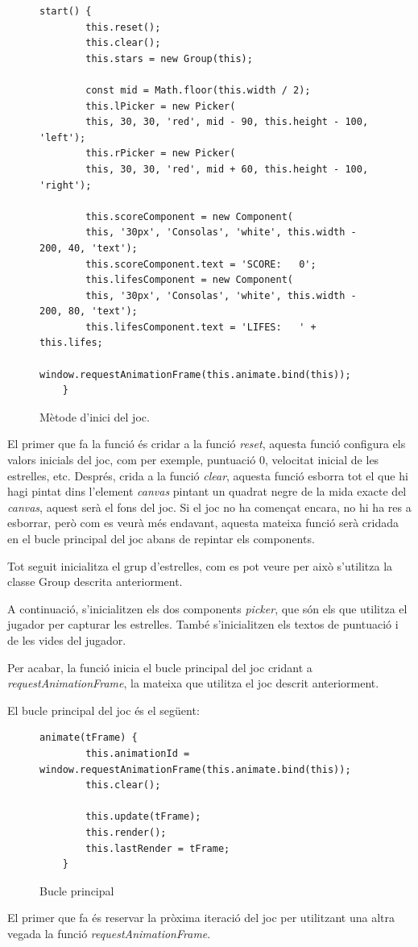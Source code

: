 \documentclass[12pt,a4paper,catalan]{article}
\begin{document}
	\begin{figure}[H]
	\begin{lstlisting}[]
	start() {
		this.reset();
		this.clear();
		this.stars = new Group(this);
		
		const mid = Math.floor(this.width / 2);
		this.lPicker = new Picker(
		this, 30, 30, 'red', mid - 90, this.height - 100, 'left');
		this.rPicker = new Picker(
		this, 30, 30, 'red', mid + 60, this.height - 100, 'right');
		
		this.scoreComponent = new Component(
		this, '30px', 'Consolas', 'white', this.width - 200, 40, 'text');
		this.scoreComponent.text = 'SCORE:   0';
		this.lifesComponent = new Component(
		this, '30px', 'Consolas', 'white', this.width - 200, 80, 'text');
		this.lifesComponent.text = 'LIFES:   ' + this.lifes;
		window.requestAnimationFrame(this.animate.bind(this));
	}
	\end{lstlisting}
	\caption{Mètode d'inici del joc.}
	\label{fig:start-method}
	\end{figure}
	El primer que fa la funció és cridar a la funció \textit{reset}, aquesta funció configura els valors inicials del joc, com per exemple, puntuació 0, velocitat inicial de les estrelles, etc.
	Després, crida a la funció \textit{clear}, aquesta funció esborra tot el que hi hagi pintat dins l'element \textit{canvas} pintant un quadrat negre de la mida exacte del \textit{canvas}, aquest serà el fons del joc. Si el joc no ha començat encara, no hi ha res a esborrar, però com es veurà més endavant, aquesta mateixa funció serà cridada en el bucle principal del joc abans de repintar els components.
	
	Tot seguit inicialitza el grup d'estrelles, com es pot veure per això s'utilitza la classe Group descrita anteriorment.
	
	A continuació, s'inicialitzen els dos components \textit{picker}, que són els que utilitza el jugador per capturar les estrelles. També s'inicialitzen els textos de puntuació i de les vides del jugador.
	
	Per acabar, la funció inicia el bucle principal del joc cridant a \textit{requestAnimationFrame}, la mateixa que utilitza el joc descrit anteriorment.
	
	El bucle principal del joc és el següent:
	\begin{figure}[H]
	\begin{lstlisting}[]
	animate(tFrame) {
		this.animationId = window.requestAnimationFrame(this.animate.bind(this));
		this.clear();
		
		this.update(tFrame);
		this.render();
		this.lastRender = tFrame;
	}
	\end{lstlisting}
	\caption{Bucle principal}
	\label{fig:catch-stars-loop}
	\end{figure}
	El primer que fa és reservar la pròxima iteració del joc per utilitzant una altra vegada la funció \textit{requestAnimationFrame}.
	
\end{document}
